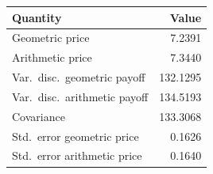 \begin{tabular}{lr}
\toprule
Quantity & Value \\
\midrule
Geometric price & 7.2391 \\
Arithmetic price & 7.3440 \\
Var.\ disc.\ geometric payoff & 132.1295 \\
Var.\ disc.\ arithmetic payoff & 134.5193 \\
Covariance & 133.3068 \\
Std.\ error geometric price & 0.1626 \\
Std.\ error arithmetic price & 0.1640 \\
\bottomrule
\end{tabular}

